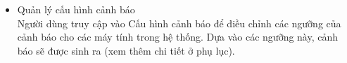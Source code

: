\begin{itemize}
\item{Quản lý cấu hình cảnh báo}\\
Người dùng truy cập vào Cấu hình cảnh báo để điều chỉnh các ngưỡng của cảnh báo cho các máy tính trong hệ thống. Dựa vào các ngưỡng này, cảnh báo sẽ được sinh ra (xem thêm chi tiết ở phụ lục).

\end{itemize}
